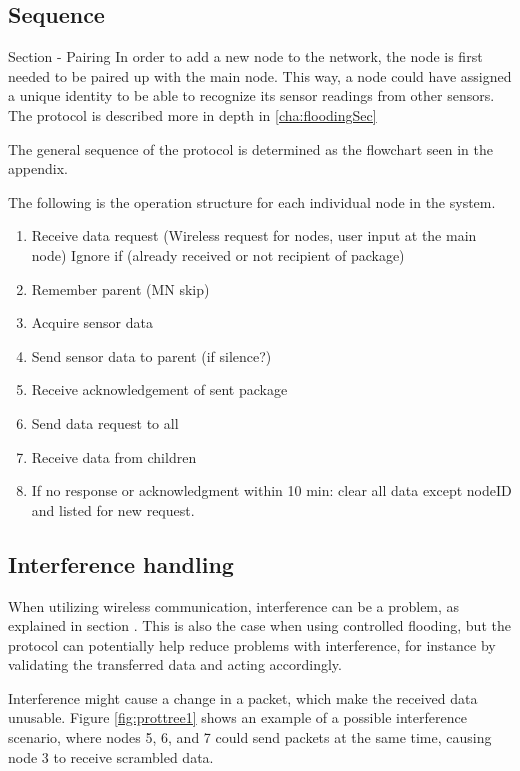 \subsection{Sequence}

Section - Pairing 
In order to add a new node to the network, the node is first needed to be paired up with the main node.
This way, a node could have assigned a unique identity to be able to recognize its sensor readings from other sensors. 
The protocol is described more in depth in \ref{cha:floodingSec}

The general sequence of the protocol is determined as the flowchart seen in the appendix.

The following is the operation structure for each individual node in the system.
\begin{enumerate}
	\item Receive data request (Wireless request for nodes, user input at the main node)
	\subitem Ignore if (already received or not recipient of package)
	\item Remember parent (MN skip)
	\item Acquire sensor data
	\item Send sensor data to parent (if silence?)
	\item Receive acknowledgement of sent package
	\item Send data request to all
	\item Receive data from children
	\item If no response or acknowledgment within 10 min: clear all data except nodeID and listed for new request.
\end{enumerate}

\subsection{Interference handling} \label{cha:crcDesign}
When utilizing wireless communication, interference can be a problem, as explained in section . This is also the case when using controlled flooding, but the protocol can potentially help reduce problems with interference, for instance by validating the transferred data and acting accordingly.

Interference might cause a change in a packet, which make the received data unusable. Figure \ref{fig:prottree1} shows an example of a possible interference scenario, where nodes 5, 6, and 7 could send packets at the same time, causing node 3 to receive scrambled data.

